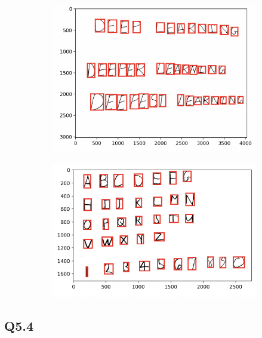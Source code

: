\documentclass{article}
\begin{document}
\begin{figure}
    \centering
    \begin{subfigure}[h]{0.4\textwidth}
        \includegraphics[width=\textwidth]{box3.png}
    \end{subfigure}
    \hfill
    \begin{subfigure}[h]{0.4\textwidth}
        \includegraphics[width=\textwidth]{box4.png}
    \end{subfigure}
\end{figure}
\newpage
\subsection*{Q5.4}
\end{document}
